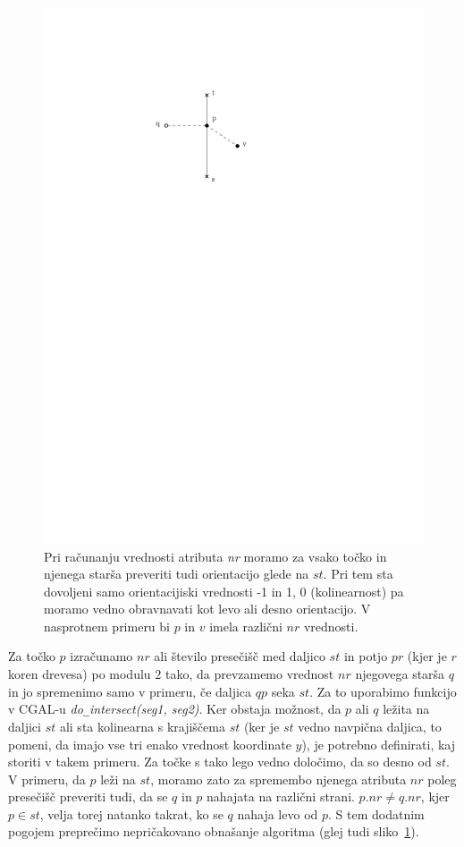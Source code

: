 \documentclass[a4paper, 12pt]{book}
\newcommand{\U}{\texttt{\_}}
\begin{document}
\begin{figure}
\centerline{\includegraphics[scale=1]{pics/nrSideExample.pdf}}
\caption{Pri računanju vrednosti atributa \textit{nr} moramo za vsako točko in njenega starša preveriti tudi orientacijo glede na $st$. Pri tem sta dovoljeni samo orientacijiski vrednosti -1 in 1, 0 (kolinearnost) pa moramo vedno obravnavati kot levo ali desno orientacijo. V nasprotnem primeru bi $p$ in $v$ imela različni $nr$ vrednosti.}
\label{pq-left-right}
\end{figure}

Za točko $p$ izračunamo $nr$ ali število presečišč med daljico $st$ in potjo $pr$ (kjer je $r$ koren drevesa) po modulu $2$ tako, da prevzamemo vrednost $nr$  njegovega starša $q$ in jo spremenimo samo v primeru, če daljica $qp$ seka $st$. Za to uporabimo funkcijo v CGAL-u \textit{do\U intersect(seg1, seg2)}. Ker obstaja možnost, da $p$ ali $q$ ležita na daljici $st$ ali sta kolinearna s krajiščema $st$ (ker je $st$ vedno navpična daljica, to pomeni, da imajo vse tri enako vrednost koordinate $y$), je potrebno definirati, kaj storiti v takem primeru. Za točke s tako lego vedno določimo, da so desno od $st$.  V primeru, da $p$ leži na $st$, moramo zato za spremembo njenega atributa $nr$ poleg presečišč preveriti tudi, da se $q$ in $p$ nahajata na različni strani. $p.nr\neq q.nr$, kjer $p\in st$, velja torej natanko takrat, ko se $q$ nahaja levo od $p$. S tem dodatnim pogojem preprečimo nepričakovano obnašanje algoritma (glej tudi sliko~\ref{pq-left-right}).
\end{document}
